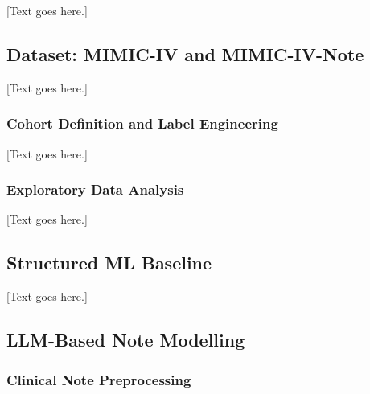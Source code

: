 \documentclass[12pt, a4paper]{article}
\begin{document}
[Text goes here.]

\subsection{Dataset: MIMIC-IV and MIMIC-IV-Note}

[Text goes here.]

\subsubsection{Cohort Definition and Label Engineering}

[Text goes here.]

\subsubsection{Exploratory Data Analysis}

[Text goes here.]

\subsection{Structured ML Baseline}

[Text goes here.]

\subsection{LLM-Based Note Modelling}

\subsubsection{Clinical Note Preprocessing}
\end{document}
